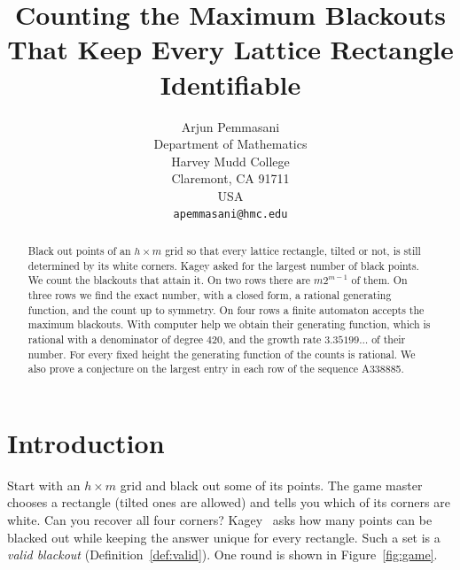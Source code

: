\documentclass[12pt]{article}
\title{Counting the Maximum Blackouts That Keep Every Lattice Rectangle Identifiable}
\author{Arjun Pemmasani\\
Department of Mathematics\\
Harvey Mudd College\\
Claremont, CA 91711\\
USA\\
\texttt{apemmasani@hmc.edu}}
\date{}
\theoremstyle{plain}
\theoremstyle{definition}
\theoremstyle{remark}
\begin{document}
\maketitle

\begin{abstract}
Black out points of an $h\times m$ grid so that every lattice rectangle, tilted
or not, is still determined by its white corners. Kagey asked for the largest
number of black points. We count the blackouts that attain it. On two rows
there are $m2^{m-1}$ of them. On three rows we find the exact number, with a
closed form, a rational generating function, and the count up to symmetry. On
four rows a finite automaton accepts the maximum blackouts. With computer help
we obtain their generating function, which is rational with a denominator of
degree $420$, and the growth rate $3.35199\ldots$ of their number. For every
fixed height the generating function of the counts is rational. We also prove
a conjecture on the largest entry in each row of the sequence A338885.
\end{abstract}

\section{Introduction}\label{sec:intro}

Start with an $h\times m$ grid and black out some of its points.
The game master chooses a rectangle (tilted ones are allowed) and tells
you which of its corners are white. Can you recover all four corners?
Kagey~\cite{kagey001,kageyG4G14} asks how many points can be blacked out
while keeping the answer unique for every rectangle.
Such a set is a \emph{valid blackout} (Definition~\ref{def:valid}).
One round is shown in Figure~\ref{fig:game}.
\end{document}
